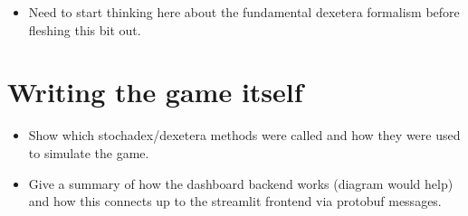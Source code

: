\begin{itemize}
\item{Need to start thinking here about the fundamental dexetera formalism before fleshing this bit out.}
\end{itemize}

\section{\sffamily Writing the game itself}

\begin{itemize}
\item{Show which stochadex/dexetera methods were called and how they were used to simulate the game.}
\item{Give a summary of how the dashboard backend works (diagram would help) and how this connects up to the streamlit frontend via protobuf messages.}
\end{itemize}